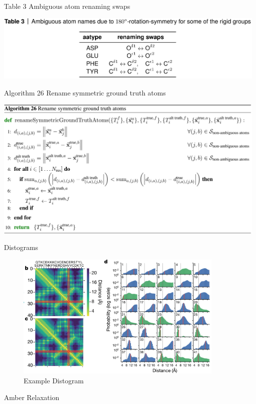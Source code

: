 \documentclass[presentation, smaller]{beamer}
\begin{document}
\begin{frame}[label={sec:orgfa7989f}]{Table 3 Ambiguous atom renaming swaps \cite{jumperHighlyAccurateProtein2021}}
\begin{center}
\includegraphics[width=\textwidth]{./imgs/table3_atom_renaming.png}
\end{center}
\end{frame}

\begin{frame}[label={sec:orgaef3a24}]{Algorithm 26 Rename symmetric ground truth atoms \cite{jumperHighlyAccurateProtein2021}}
\begin{center}
\includegraphics[width=.9\linewidth]{./imgs/algo26_rename-truth-atoms.png}
\end{center}
\end{frame}
\begin{frame}[label={sec:org1d0d559}]{Distograms \cite{jumperHighlyAccurateProtein2021}}
\begin{figure}[htbp]
\centering
\includegraphics[width=0.9\textwidth]{./imgs/distogram_example.png}
\caption{Example Distogram \protect\cite{seniorImprovedProteinStructure2020}}
\end{figure}
\end{frame}
\begin{frame}[label={sec:org5d58972}]{Amber Relaxation}
\end{frame}
\end{document}
